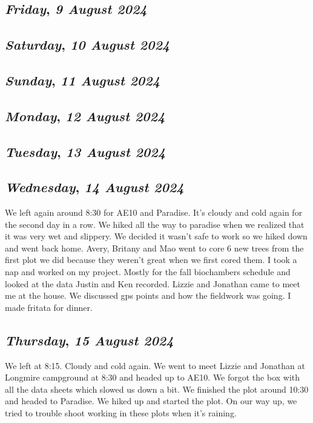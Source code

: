 \def\day{\textit{9 August 2024}}
\def\weekday{\textit{Friday}}
\subsection*{\weekday, \day}

\def\day{\textit{10 August 2024}}
\def\weekday{\textit{Saturday}}
\subsection*{\weekday, \day}

\def\day{\textit{11 August 2024}}
\def\weekday{\textit{Sunday}}
\subsection*{\weekday, \day}

\def\day{\textit{12 August 2024}}
\def\weekday{\textit{Monday}}
\subsection*{\weekday, \day}

\def\day{\textit{13 August 2024}}
\def\weekday{\textit{Tuesday}}
\subsection*{\weekday, \day}

\def\day{\textit{14 August 2024}}
\def\weekday{\textit{Wednesday}}
\subsection*{\weekday, \day}
We left again around 8:30 for AE10 and Paradise. It's cloudy and cold again for the second day in a row. We hiked all the way to paradise when we realized that it was very wet and slippery. We decided it wasn't safe to work so we hiked down and went back home. Avery, Britany and Mao went to core 6 new trees from the first plot we did because they weren't great when we first cored them. I took a nap and worked on my project. Mostly for the fall biochambers schedule and looked at the data Justin and Ken recorded.
Lizzie and Jonathan came to meet me at the house. We discussed gps points and how the fieldwork was going. I made fritata for dinner.

\def\day{\textit{15 August 2024}}
\def\weekday{\textit{Thursday}}
\subsection*{\weekday, \day}
We left at 8:15. Cloudy and cold again. We went to meet Lizzie and Jonathan at Longmire campground at 8:30 and headed up to AE10. We forgot the box with all the data sheets which slowed us down a bit. We finished the plot around 10:30 and headed to Paradise. We hiked up and started the plot. On our way up, we tried to trouble shoot working in these plots when it's raining.

